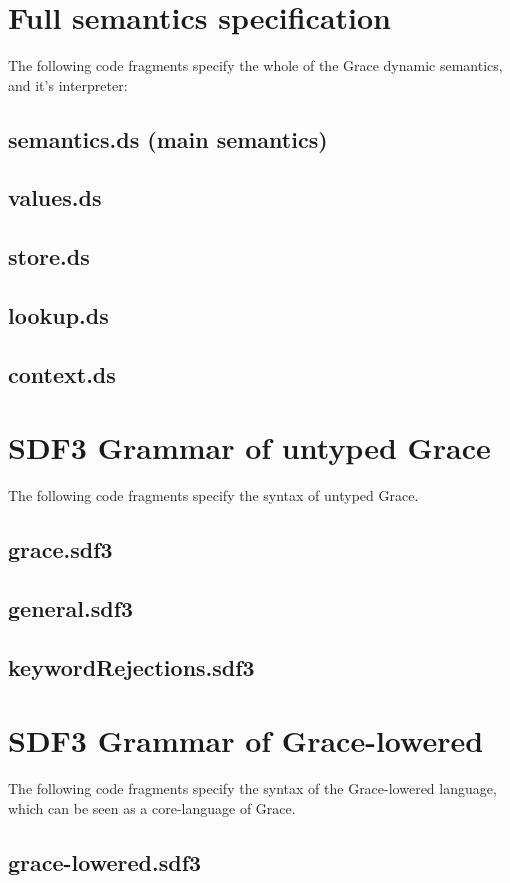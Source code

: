\documentclass[a4paper,UKenglish]{lipics-v2016}
\begin{document}
\section{Full semantics specification}
The following code fragments specify the whole of the Grace dynamic semantics, and it's interpreter:
\subsection{semantics.ds (main semantics)}

\subsection{values.ds}

\subsection{store.ds}

\subsection{lookup.ds}

\subsection{context.ds}


\section{SDF3 Grammar of untyped Grace}
The following code fragments specify the syntax of untyped Grace.

\subsection{grace.sdf3}

\subsection{general.sdf3}

\subsection{keywordRejections.sdf3}


\section{SDF3 Grammar of Grace-lowered}
The following code fragments specify the syntax of the Grace-lowered language, which can be seen as a core-language of Grace.

\subsection{grace-lowered.sdf3}






\end{document}
